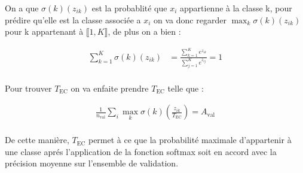 \documentclass{article}
\begin{document}
On a que $\sigma(k)(z_{ik})$ est la probablité que $x_i$ appartienne à la classe k, pour prédire qu'elle est la classe associée a $x_i$ on va donc regarder $\max_{k}\sigma(k)(z_{ik})$ pour k appartenant à \(\llbracket 1, K \rrbracket\), de plus on a bien :

\begin{align*}
\sum_{k=1}^{K} \sigma(k) (z_{ik}) &= \frac{\sum_{k=1}^{K} e^{z_{ik}}}{\sum_{j=1}^{K} e^{z_{ij}}} = 1 \\
\end{align*}

Pour trouver $T_{\text{EC}}$ on va enfaite prendre $T_{\text{EC}}$ telle que :

\begin{align*}
\frac{1}{n_{\text{val}}} \sum_{i} \max_{k}\sigma(k) \left(\frac{z_{ik}}{T_{\text{EC}}}\right) = A_{\text{val}}\\
\end{align*}

De cette manière, $T_{\text{EC}}$ permet à ce que la probabilité maximale d'appartenir à une classe aprés l'application de la fonction softmax soit en accord avec la précision moyenne sur l’ensemble de validation.
\end{document}
